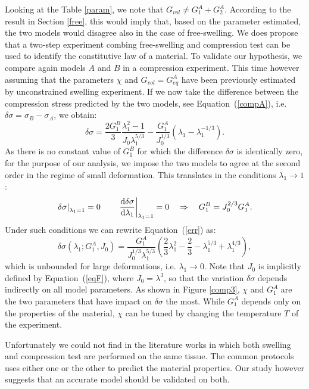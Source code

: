 Looking at the Table  \ref{param}, we note that $G_{vol}\neq G^A_{1}+G^A_2$. According to the result in Section \ref{free}, this would imply that, based on the parameter estimated, the two models would disagree also in the case of free-swelling. We does propose that a two-step experiment combing free-swelling and compression test can be used to identify the constitutive law of a material. To validate our hypothesis, we compare again models $A$ and $B$ in a compression experiment. This time however assuming that the parameters $\chi$ and $G_{vol}=G^A_{eq}$ have been previously estimated by unconstrained swelling experiment. If we now take the difference between the compression stress predicted by the two models, see Equation~(\ref{compA}), i.e. $\delta \sigma= \sigma_{B}-\sigma_{A}$, we obtain:
\begin{equation}
\delta \sigma = \frac{2 G_1^{B}}{3} \frac{\lambda_1^2-1}{J_0\lambda_1^{5/3}} - \frac{G_1^A}{J_0^{1/3}}(\lambda_1-\lambda_1^{-1/3}).\label{err}
\end{equation}
As there is no constant value of $G^{B}_1$ for which the difference $\delta \sigma$ is identically zero, for the purpose of our analysis, we impose the two models to agree at the second order in the regime of small deformation. This translates in the conditions $\lambda_1\rightarrow 1$:
\begin{equation}
\left.\delta \sigma\right|_{\lambda_1=1}=0 \qquad \left.\frac{\text{d} \delta \sigma}{\text{d} \lambda_1}\right|_{\lambda_1=1}=0 \quad\Rightarrow \quad G_1^{B} = J_0^{2/3}G_1^A.
\end{equation}
Under such conditions we can rewrite Equation~(\ref{err}) as:
\begin{equation}
\delta \sigma(\lambda_1;G^A_1,J_0) = \frac{G_1^A}{J^{1/3}_0\lambda_1^{5/3}} \left(\frac{2}{3}\lambda^2_1-\frac{2}{3}-\lambda_1^{5/3}+\lambda_1^{4/3}\right), 
\end{equation}
which is unbounded for large deformations, i.e. $\lambda_1\rightarrow0$. Note that $J_0$ is implicitly defined by Equation~(\ref{eqF}), where $J_0=\lambda^3$, so that the variation $\delta\sigma$ depends indirectly on all model parameters. As shown in Figure \ref{comp3}, $\chi$ and $G_1^A$ are the two parameters that have impact on $\delta\sigma$ the most. While $G_1^A$ depends only on the properties of the material, $\chi$ can be tuned by changing the temperature $T$ of the experiment. 

Unfortunately we could not find in the literature works in which both swelling and compression test are performed on the same tissue. The common protocols uses either one or the other to predict the material properties. Our study however suggests that an accurate model should be validated on both. 
